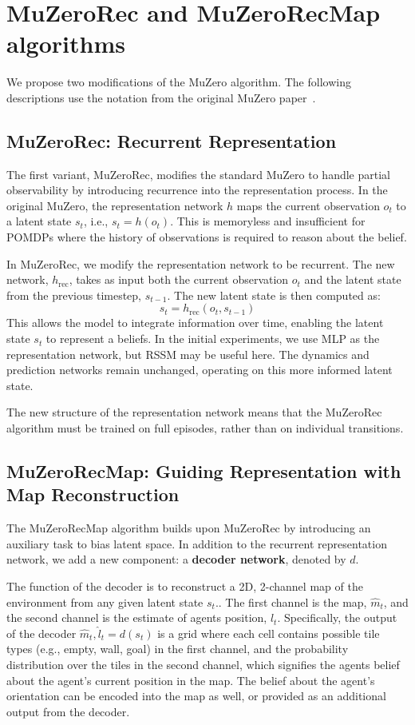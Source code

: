\documentclass[12pt]{article}
\begin{document}
\section{MuZeroRec and MuZeroRecMap algorithms}
We propose two modifications of the MuZero algorithm.
The following descriptions use the notation from the original MuZero paper~\cite{schrittwieserMasteringAtariGo2020}.

\subsection{MuZeroRec: Recurrent Representation}

The first variant, MuZeroRec, modifies the standard MuZero to handle partial observability by introducing recurrence into the representation process.
In the original MuZero, the representation network $h$ maps the current observation $o_t$ to a latent state $s_t$, i.e., $s_t = h(o_t)$.
This is memoryless and insufficient for POMDPs where the history of observations is required to reason about the belief.

In MuZeroRec, we modify the representation network to be recurrent.
The new network, $h_{\text{rec}}$, takes as input both the current observation $o_t$ and the latent state from the previous timestep, $s_{t-1}$.
The new latent state is then computed as:
$$s_t = h_{\text{rec}}(o_t, s_{t-1})$$
This allows the model to integrate information over time, enabling the latent state $s_t$ to represent a beliefs. In the initial experiments, we use MLP as the representation network, but RSSM may be useful here. 
The dynamics and prediction networks remain unchanged, operating on this more informed latent state.

The new structure of the representation network means that the MuZeroRec algorithm must be trained on full episodes, rather than on individual transitions. 

\subsection{MuZeroRecMap: Guiding Representation with Map Reconstruction}

The MuZeroRecMap algorithm builds upon MuZeroRec by introducing an auxiliary task to bias latent space. In addition to the recurrent representation network, we add a new component: a \textbf{decoder network}, denoted by $d$.

The function of the decoder is to reconstruct a 2D, 2-channel map of the environment from any given latent state $s_t$.. The first channel is the map,  $\hat{m}_t$, and the second channel is the estimate of agents position, $\hat{l}_t$. Specifically, the output of the decoder $\hat{m}_t, \hat{l}_t = d(s_t)$ is a grid where each cell contains possible tile types (e.g., empty, wall, goal) in the first channel, and the probability distribution over the tiles in the second channel, which signifies the agents belief about the agent's current position in the map. The belief about the agent's orientation can be encoded into the map as well, or provided as an additional output from the decoder. 
\end{document}
